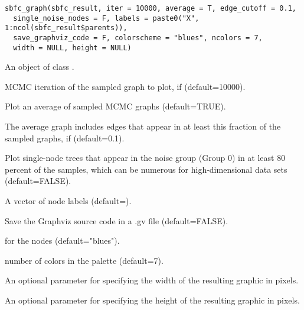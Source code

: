 \documentclass[a4paper]{book}
\begin{document}
%
\begin{Usage}
\begin{verbatim}
sbfc_graph(sbfc_result, iter = 10000, average = T, edge_cutoff = 0.1,
  single_noise_nodes = F, labels = paste0("X", 1:ncol(sbfc_result$parents)),
  save_graphviz_code = F, colorscheme = "blues", ncolors = 7,
  width = NULL, height = NULL)
\end{verbatim}
\end{Usage}
%
\begin{Arguments}
\begin{ldescription}
\item[\code{sbfc\_result}] An object of class .

\item[\code{iter}] MCMC iteration of the sampled graph to plot, if  (default=10000).

\item[\code{average}] Plot an average of sampled MCMC graphs (default=TRUE).

\item[\code{edge\_cutoff}] The average graph includes edges that appear in at least this fraction of the sampled graphs, if  (default=0.1).

\item[\code{single\_noise\_nodes}] Plot single-node trees that appear in the noise group (Group 0) in at least 80 percent of the samples, which can be numerous for high-dimensional data sets (default=FALSE).

\item[\code{labels}] A vector of node labels (default=).

\item[\code{save\_graphviz\_code}] Save the Graphviz source code in a .gv file (default=FALSE).

\item[\code{colorscheme}]  for the nodes (default="blues").

\item[\code{ncolors}] number of colors in the palette (default=7).

\item[\code{width}] An optional parameter for specifying the width of the resulting graphic in pixels.

\item[\code{height}] An optional parameter for specifying the height of the resulting graphic in pixels.
\end{ldescription}
\end{Arguments}
\end{document}
